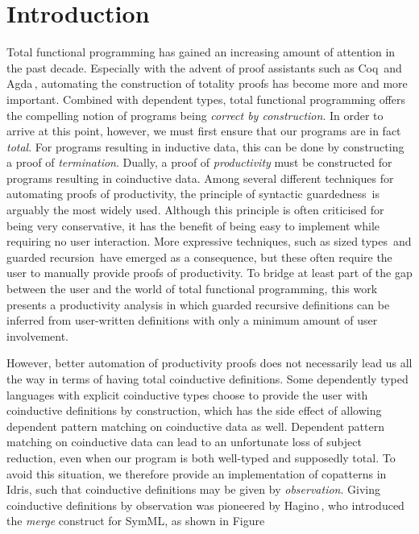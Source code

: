 \chapter{Introduction}

Total functional programming has gained an increasing amount of attention in the
past decade. Especially with the advent of proof assistants such as
Coq\,\citep{Coq:manual} and Agda\,\citep{Norell:thesis}, automating
the construction of totality proofs has become more and more important. Combined
with dependent types, total functional programming offers the compelling notion
of programs being \emph{correct by construction}. In order to arrive at this
point, however, we must first ensure that our programs are in fact
\emph{total}. For programs resulting in inductive data, this can be done by constructing a proof of
\emph{termination}. Dually, a proof of \emph{productivity}
must be constructed for programs resulting in coinductive data. Among several
different techniques for automating proofs of productivity, the principle of
syntactic guardedness\,\citep{Coquand94} is arguably the most widely used. Although this principle
is often criticised for being very conservative, it has the benefit of being easy
to implement while requiring no user interaction. More expressive techniques,
such as sized types\,\citep{Abel99terminationchecking} and guarded
recursion\,\citep{Nakano:2000} have emerged as a consequence, but these often
require the user to manually provide proofs of productivity. To bridge at least
part of the gap between the user and the world of total functional programming,
this work presents a productivity analysis in which guarded recursive definitions
can be inferred from user-written definitions with only a minimum amount of user
involvement.

However, better automation of productivity proofs does not necessarily lead us
all the way in terms of having total coinductive definitions. Some dependently
typed languages with explicit coinductive types choose to provide the user with
coinductive definitions by construction, which has the side effect of allowing
dependent pattern matching on coinductive data as well. Dependent pattern
matching on coinductive data can lead to an
unfortunate loss of subject reduction, even when our program is both well-typed
and supposedly total. To avoid this situation, we therefore provide an
implementation of copatterns in Idris, such that coinductive definitions may be
given by \emph{observation}. Giving coinductive definitions by observation was
pioneered by Hagino\,\citep{Hagino89}, who introduced the \emph{merge} construct
for SymML, as shown in Figure~

